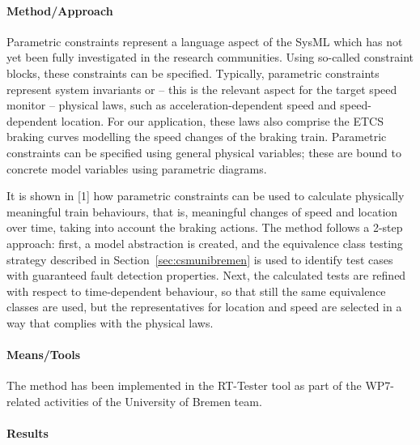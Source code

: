 \paragraph{Method/Approach}

Parametric constraints represent a language aspect of the SysML which has not yet
been fully investigated in the research communities. Using so-called constraint
blocks, these constraints can be specified. Typically, parametric constraints 
represent system invariants or -- this is the relevant aspect for the target speed monitor --
physical laws, such as acceleration-dependent speed and speed-dependent location. 
For our application, these laws also comprise the ETCS braking curves modelling the
speed changes of the braking train.
Parametric constraints can be specified using general physical variables; these are 
bound to concrete model variables using parametric diagrams. 

It is shown in [1] how parametric constraints can be used to calculate physically
meaningful train behaviours, that is, meaningful changes of speed and location over
time, taking into account the braking actions. The method follows a 2-step approach: 
first, a model abstraction is created, and  the equivalence class testing 
strategy described in Section~\ref{sec:csmunibremen} is used to identify
test cases with guaranteed fault detection properties. Next, the calculated tests
are refined with respect to time-dependent behaviour, so that still the same 
equivalence classes  are used, but the representatives for location and speed
are selected in a way that complies with the physical laws.

 


\paragraph{Means/Tools}

The method has been implemented in the RT-Tester tool as part of the WP7-related
activities of the University of Bremen team.

\paragraph{Results}

